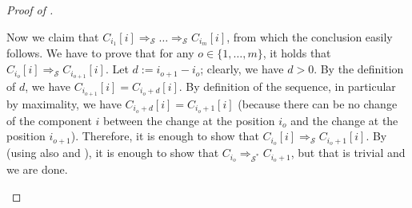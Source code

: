 \begin{proof}[Proof of ]
\begin{itemize}
          Now we claim that $C_{i_1}[i] \Rightarrow_{\mathcal{S}} \ldots \Rightarrow_{\mathcal{S}} C_{i_m}[i]$,
          from which the conclusion easily follows.
          We have to prove that for any $o \in \{ 1, \ldots, m \}$, it holds that
          $C_{i_o}[i] \Rightarrow_{\mathcal{S}} C_{i_{o+1}}[i]$.
          Let $d := i_{o+1} - i_{o}$; clearly, we have $d > 0$.
          By the definition of $d$, we have $C_{i_{o+1}}[i] = C_{i_{o} + d}[i]$.
          By definition of the sequence, in particular by maximality, we have $C_{i_{o} + d}[i] = C_{i_{o} + 1}[i]$
          (because there can be no change of the component $i$ between the change at the position $i_o$ and the change at the position $i_{o+1}$).
          Therefore, it is enough to show that
          $C_{i_o}[i] \Rightarrow_{\mathcal{S}} C_{i_{o}+1}[i]$.
          By  (using also  and ), it is enough to show that
          $C_{i_{o}} \Rightarrow_{\mathcal{S}^*} C_{i_{o}+1}$, but that is trivial and we are done.
\end{itemize}
\end{proof}

